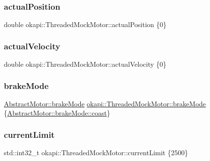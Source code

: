 \subsubsection{\texorpdfstring{actualPosition}{actualPosition}}
{\footnotesize\ttfamily double okapi\+::\+Threaded\+Mock\+Motor\+::actual\+Position \{0\}}

\mbox{\label{classokapi_1_1ThreadedMockMotor_a215bba832fd2089c4728ce20373e1873}} 
\subsubsection{\texorpdfstring{actualVelocity}{actualVelocity}}
{\footnotesize\ttfamily double okapi\+::\+Threaded\+Mock\+Motor\+::actual\+Velocity \{0\}}

\mbox{\label{classokapi_1_1ThreadedMockMotor_a6cdc3db5704767c8619924556625a090}} 
\subsubsection{\texorpdfstring{brakeMode}{brakeMode}}
{\footnotesize\ttfamily \mbox{\hyperlink{classokapi_1_1AbstractMotor_a132e0485dbb59a60c3f934338d8fa601}{Abstract\+Motor\+::brake\+Mode}} \mbox{\hyperlink{classokapi_1_1AbstractMotor_a132e0485dbb59a60c3f934338d8fa601}{okapi\+::\+Threaded\+Mock\+Motor\+::brake\+Mode}} \{\mbox{\hyperlink{classokapi_1_1AbstractMotor_a132e0485dbb59a60c3f934338d8fa601a756d153ba898e1be8218d4651009e981}{Abstract\+Motor\+::brake\+Mode\+::coast}}\}}

\mbox{\label{classokapi_1_1ThreadedMockMotor_a969e78b369e2fddfccb961c37a55176d}} 
\subsubsection{\texorpdfstring{currentLimit}{currentLimit}}
{\footnotesize\ttfamily std\+::int32\+\_\+t okapi\+::\+Threaded\+Mock\+Motor\+::current\+Limit \{2500\}}

